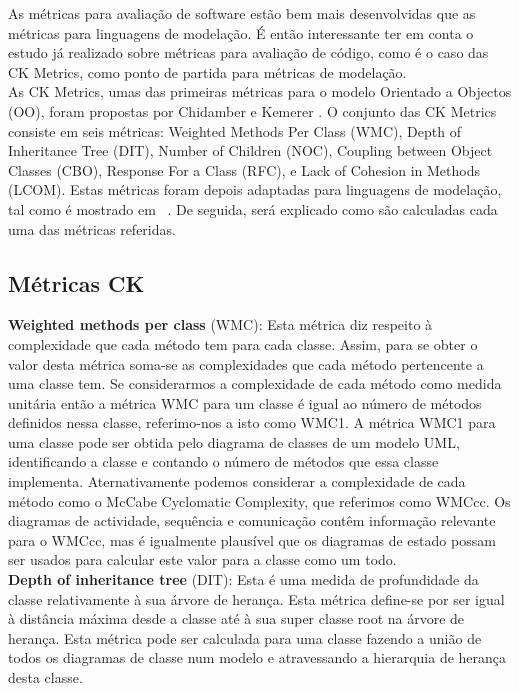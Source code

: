 As métricas para avaliação de  software estão bem mais desenvolvidas que as métricas para linguagens de modelação. É então interessante ter em conta o estudo já realizado sobre métricas para avaliação de código, como é o caso das CK Metrics, como ponto de partida para métricas de modelação.\\
As CK Metrics, umas das primeiras métricas para o modelo Orientado a Objectos (OO), foram propostas por Chidamber e  Kemerer \cite{Chidamber:1994:MSO:630808.631131}. O conjunto das CK Metrics consiste em seis métricas: Weighted Methods Per Class (WMC), Depth of Inheritance Tree (DIT), Number of Children (NOC), Coupling between Object Classes (CBO), Response For a Class (RFC), e Lack of Cohesion in Methods (LCOM). Estas métricas foram depois adaptadas para linguagens de modelação, tal como é mostrado em ~\cite{Power2}. De seguida, será explicado como são calculadas cada uma das métricas referidas.

\subsection{Métricas \textrm{CK}}
\textbf{Weighted methods per class} (WMC):
Esta métrica diz respeito à complexidade que cada método tem para cada classe. Assim, para se obter o valor desta métrica soma-se
as complexidades que cada método pertencente a uma classe tem. Se considerarmos a complexidade de cada método como medida unitária
então a métrica WMC para um classe é igual ao número de métodos definidos nessa classe, referimo-nos a isto como WMC1.
A métrica WMC1 para uma classe pode ser obtida pelo diagrama de classes de um modelo UML, identificando a classe e contando o número
de métodos que essa classe implementa. Aternativamente podemos considerar a complexidade de cada método como o McCabe Cyclomatic Complexity, que referimos
como WMCcc. Os diagramas de actividade, sequência e comunicação contêm informação relevante para o WMCcc, mas é igualmente
plausível que os diagramas de estado possam ser usados para calcular este valor para a classe como um todo.\\

\textbf{Depth of inheritance tree} (DIT):
Esta é uma medida de profundidade da classe relativamente à sua árvore de herança. Esta métrica define-se por ser igual à distância máxima
desde a classe até à sua super classe root na árvore de herança. Esta métrica pode ser calculada para uma classe fazendo a união de todos os diagramas
de classe num modelo \umlS e atravessando a hierarquia de herança desta classe.\\

